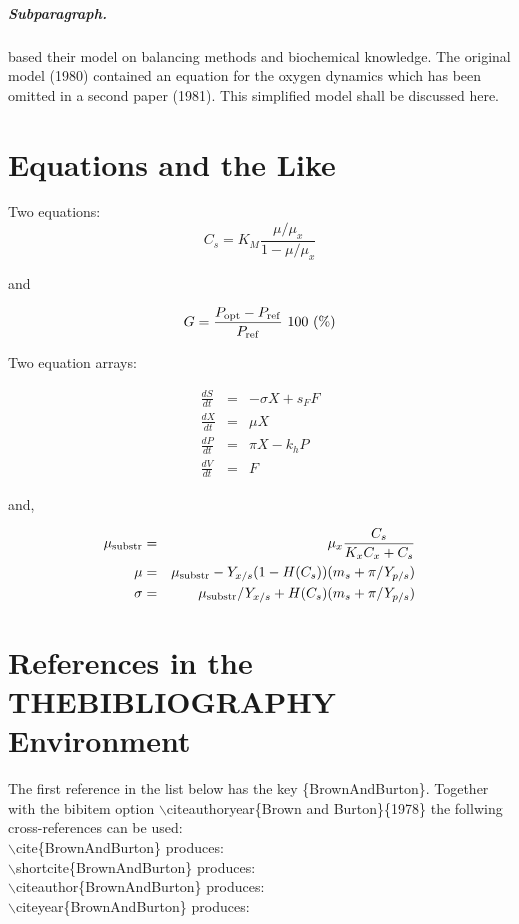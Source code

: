 \documentclass{kluwer}    %
\begin{document}
\begin{article}
\subparagraph{Subparagraph.}
\cite{Carr-Goldstein,Cohen-Jones88-book} 
based their model on balancing methods and
biochemical know\-ledge. The original model (1980) contained an equation for the
oxygen dynamics which has been omitted in a second paper 
(1981). This simplified model shall be discussed here.



\section{Equations and the Like}

Two equations:
\begin{equation}
    C_{s}  =  K_{M} \frac{\mu/\mu_{x}}{1-\mu/\mu_{x}} \label{ccs}
\end{equation}

and

\begin{equation}
    G = \frac{P_{\rm opt} - P_{\rm ref}}{P_{\rm ref}} \mbox{\ }100 \mbox{\ }(\%)
\end{equation}

Two equation arrays:

\begin{eqnarray}
  \frac{dS}{dt} & = & - \sigma X + s_{F} F\\
  \frac{dX}{dt} & = &   \mu    X\\
  \frac{dP}{dt} & = &   \pi    X - k_{h} P\\
  \frac{dV}{dt} & = &   F
\end{eqnarray}

and,

\begin{eqnarray}
 \mu_{\rm substr} & = & \mu_{x} \frac{C_{s}}{K_{x}C_{x}+C_{s}}  \\
 \mu              & = & \mu_{\rm substr} - Y_{x/s}(1-H(C_{s}))(m_{s}+\pi /Y_{p/s}) \\
 \sigma           & = & \mu_{\rm substr}/Y_{x/s}+ H(C_{s}) (m_{s}+ \pi /Y_{p/s})
\end{eqnarray}


\section{References in the THEBIBLIOGRAPHY Environment}
The first reference in the list below has the key \{BrownAndBurton\}.
Together with the bibitem option $\backslash$citeauthoryear\{Brown and
Burton\}\{1978\} the follwing cross-references can be used:\\
$\backslash$cite\{BrownAndBurton\} produces: \cite{BrownAndBurton}\\
$\backslash$shortcite\{BrownAndBurton\}  produces: \\  
$\backslash$citeauthor\{BrownAndBurton\}  produces: \citeauthor{BrownAndBurton}\\  
$\backslash$citeyear\{BrownAndBurton\}  produces: \citeyear{BrownAndBurton}\\  



\end{article}
\end{document}
